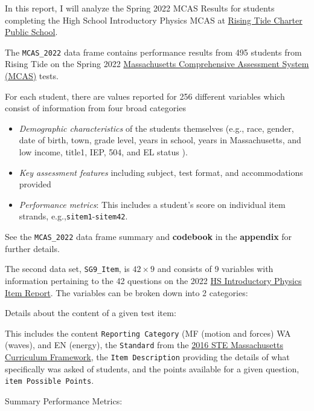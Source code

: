 \documentclass[
  letterpaper,
  DIV=11,
  numbers=noendperiod]{scrartcl}
\begin{document}
In this report, I will analyze the Spring 2022 MCAS Results for students
completing the High School Introductory Physics MCAS at
\href{https://risingtide.org/}{Rising Tide Charter Public School}.

The \texttt{MCAS\_2022} data frame contains performance results from 495
students from Rising Tide on the Spring 2022
\href{https://www.doe.mass.edu/mcas/default.html}{Massachusetts
Comprehensive Assessment System (MCAS)} tests.

For each student, there are values reported for 256 different variables
which consist of information from four broad categories

\begin{itemize}
\item
  \emph{Demographic characteristics} of the students themselves (e.g.,
  race, gender, date of birth, town, grade level, years in school, years
  in Massachusetts, and low income, title1, IEP, 504, and EL status ).
\item
  \emph{Key assessment features} including subject, test format, and
  accommodations provided
\item
  \emph{Performance metrics}: This includes a student's score on
  individual item strands, e.g.,\texttt{sitem1}-\texttt{sitem42}.
\end{itemize}

See the \texttt{MCAS\_2022} data frame summary and \textbf{codebook} in
the \textbf{appendix} for further details.

The second data set, \texttt{SG9\_Item}, is \(42 \times 9\) and consists
of 9 variables with information pertaining to the 42 questions on the
2022
\href{https://profiles.doe.mass.edu/mcas/mcasitems2.aspx?grade=HS\&subjectcode=PHY\&linkid=23\&orgcode=04830000\&fycode=2022\&orgtypecode=5\&}{HS
Introductory Physics Item Report}. The variables can be broken down into
2 categories:

Details about the content of a given test item:

This includes the content \texttt{Reporting\ Category} (MF (motion and
forces) WA (waves), and EN (energy), the \texttt{Standard} from the
\href{https://www.doe.mass.edu/frameworks/scitech/2016-04.pdf}{2016 STE
Massachusetts Curriculum Framework}, the \texttt{Item\ Description}
providing the details of what specifically was asked of students, and
the points available for a given question,
\texttt{item\ Possible\ Points}.

Summary Performance Metrics:
\end{document}
